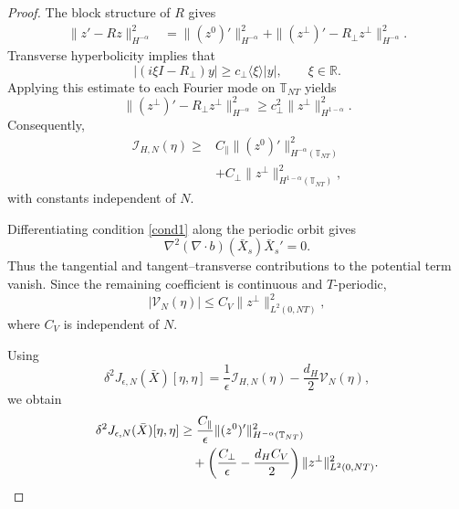 \documentclass[preprint,12pt]{elsarticle}
\theoremstyle{definition}
\theoremstyle{plain}
\begin{document}
\begin{proof}
The block structure of $R$ gives
\begin{align*}
    \|z'-Rz\|_{H^{-\alpha}}^2
    &=
    \|(z^0)'\|_{H^{-\alpha}}^2
    +
    \|(z^\perp)'-R_\perp z^\perp\|_{H^{-\alpha}}^2.
\end{align*}
Transverse hyperbolicity implies that
\begin{equation*}
    |(i\xi I-R_\perp)y|
    \geq
    c_\perp\langle\xi\rangle|y|,
    \qquad
    \xi\in\mathbb R.
\end{equation*}
Applying this estimate to each Fourier mode on $\mathbb T_{NT}$ yields
\begin{equation*}
    \|(z^\perp)'-R_\perp z^\perp\|_{H^{-\alpha}}^2
    \geq
    c_\perp^2
    \|z^\perp\|_{H^{1-\alpha}}^2.
\end{equation*}
Consequently,
\begin{equation}
\label{eq:anisotropic-kinetic-H-lesshalf}
\begin{aligned}
    \mathcal I_{H,N}(\eta)
    \geq{}&
    C_\parallel
    \|(z^0)'\|_{H^{-\alpha}(\mathbb T_{NT})}^2
    \\
    &+
    C_\perp
    \|z^\perp\|_{H^{1-\alpha}(\mathbb T_{NT})}^2,
\end{aligned}
\end{equation}
with constants independent of $N$.

Differentiating condition \eqref{cond1} along the periodic orbit gives
\begin{equation*}
    \nabla^2(\nabla\!\cdot b)(\bar X_s)\bar X_s'=0.
\end{equation*}
Thus the tangential and tangent--transverse contributions to the
potential term vanish. Since the remaining coefficient is continuous and
$T$-periodic,
\begin{equation}
\label{eq:potential-H-lesshalf}
    |\mathcal V_N(\eta)|
    \leq
    C_V
    \|z^\perp\|_{L^2(0,NT)}^2,
\end{equation}
where $C_V$ is independent of $N$.

Using
\begin{equation*}
    \delta^2J_{\epsilon,N}(\bar X)[\eta,\eta]
    =
    \frac1\epsilon\mathcal I_{H,N}(\eta)
    -
    \frac{d_H}{2}\mathcal V_N(\eta),
\end{equation*}
we obtain
\begin{align}
    \delta^2J_{\epsilon,N}(\bar X)[\eta,\eta]
    &\geq
    \frac{C_\parallel}{\epsilon}
    \|(z^0)'\|_{H^{-\alpha}(\mathbb T_{NT})}^2
    \notag\\
    &\quad+
    \left(
        \frac{C_\perp}{\epsilon}
        -
        \frac{d_HC_V}{2}
    \right)
    \|z^\perp\|_{L^2(0,NT)}^2.
    \label{eq:second-variation-H-lesshalf-final}
\end{align}


\end{proof}
\end{document}
